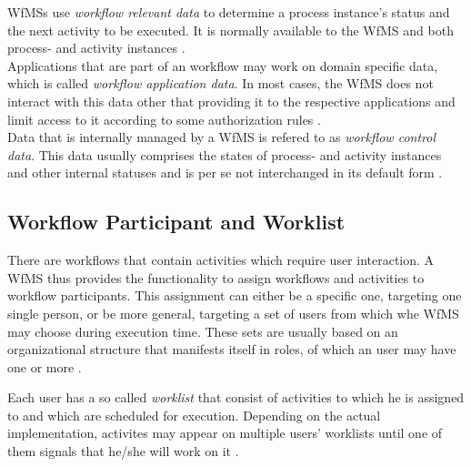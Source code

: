     \ac{WfMS}s use \emph{workflow relevant data} to determine a process instance's status and the next activity to be executed. It is normally available to the \ac{WfMS} and both process- and activity instances \cite{Hollingsworth1995Wfmc}. \\
    Applications that are part of an workflow may work on domain specific data, which is called \emph{workflow application data}. In most cases, the \ac{WfMS} does not interact with this data other that providing it to the respective applications and limit access to it according to some authorization rules \cite{Hollingsworth1995Wfmc,Casati1999Specification}. \\
    Data that is internally managed by a \ac{WfMS} is refered to as \emph{workflow control data}. This data usually comprises the states of process- and activity instances and other internal statuses and is per se not interchanged in its default form \cite{Hollingsworth1995Wfmc,Casati1999Specification}.

  \subsection{Workflow Participant and Worklist} %
  \label{sub:workflow_participants}
    There are workflows that contain activities which require user interaction. A \ac{WfMS} thus provides the functionality to assign workflows and activities to workflow participants. This assignment can either be a specific one, targeting one single person, or be more general, targeting a set of users from which whe \ac{WfMS} may choose during execution time. These sets are usually based on an organizational structure that manifests itself in roles, of which an user may have one or more \cite{Hollingsworth1995Wfmc,Casati1999Specification}.

    Each user has a so called \emph{worklist} that consist of activities to which he is assigned to and which are scheduled for execution. Depending on the actual implementation, activites may appear on multiple users' worklists until one of them signals that he/she will work on it \cite{Hollingsworth1995Wfmc,Casati1999Specification}.



